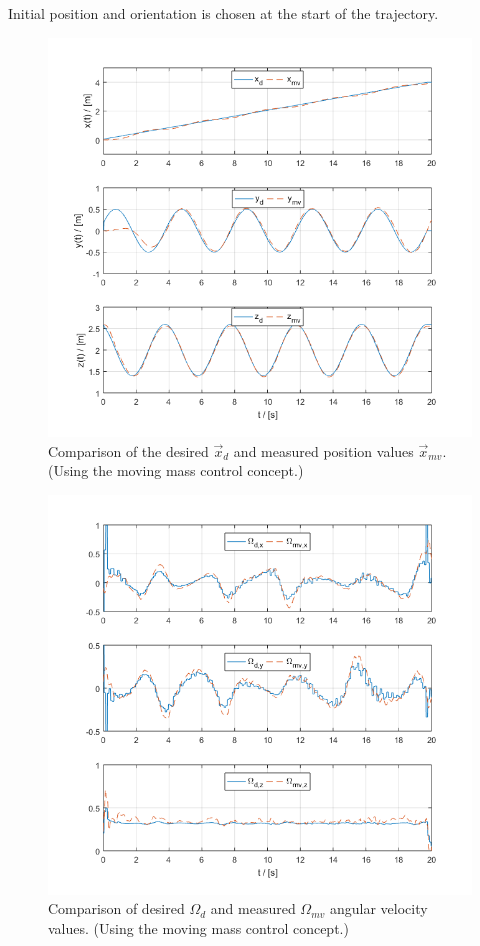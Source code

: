 \noindent Initial position and orientation is chosen at the start of the trajectory. \\

\begin{figure}[h!]
	\centering
	\includegraphics[width=\columnwidth]{./pictures/mmc_traj_pos.png}
	\caption{Comparison of the desired $\vec{x}_d$ and measured position values $\vec{x}_{mv}$. (Using the moving mass control concept.)}
	\label{fig:traj_pos}
\end{figure}

\begin{figure}[h!]
	\centering
	\includegraphics[width=\columnwidth]{./pictures/mmc_traj_omega.png}
	\caption{Comparison of desired $\Omega_d$ and measured $\Omega_{mv}$ angular velocity values. (Using the moving mass control concept.)}
	\label{fig:traj_omega}
\end{figure}

